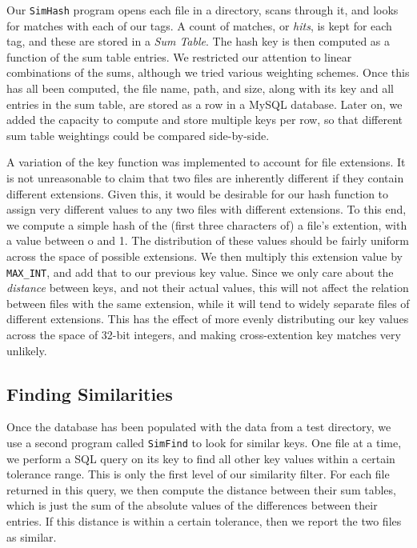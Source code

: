 \documentclass[10pt, twocolumn]{article}
\begin{document}
Our {\tt SimHash} program opens each file in a directory, scans through it, and looks for matches with each of our tags.  A count of matches, or {\it hits}, is kept for each tag, and these are stored in a {\it Sum Table}.  The hash key is then computed as a function of the sum table entries.  We restricted our attention to linear combinations of the sums, although we tried various weighting schemes.  Once this has all been computed, the file name, path, and size, along with its key and all entries in the sum table, are stored as a row in  a MySQL database.  Later on, we added the capacity to compute and store multiple keys per row, so that different sum table weightings could be compared side-by-side.

A variation of the key function was implemented to account for file extensions.  It is not unreasonable to claim that two files are inherently different if they contain different extensions.  Given this, it would be desirable for our hash function to assign very different values to any two files with different extensions.  To this end, we compute a simple hash of the (first three characters of) a file's extention, with a value between o and 1.  The distribution of these values should be fairly uniform across the space of possible extensions.  We then multiply this extension value by {\tt MAX\_INT}, and add that to our previous key value.  Since we only care about the {\it distance} between keys, and not their actual values, this will not affect the relation between files with the same extension, while it will tend to widely separate files of different extensions.  This has the effect of more evenly distributing our key values across the space of 32-bit integers, and making cross-extention key matches very unlikely.



\subsection{Finding Similarities}

Once the database has been populated with the data from a test directory, we use a second program called {\tt SimFind} to look for similar keys.  One file at a time, we perform a SQL query on its key to find all other key values within a certain tolerance range.  This is only the first level of our similarity filter.  For each file returned in this query, we then compute the distance between their sum tables, which is just the sum of the absolute values of the differences between their entries.  If this distance is within a certain tolerance, then we report the two files as similar.
\end{document}
